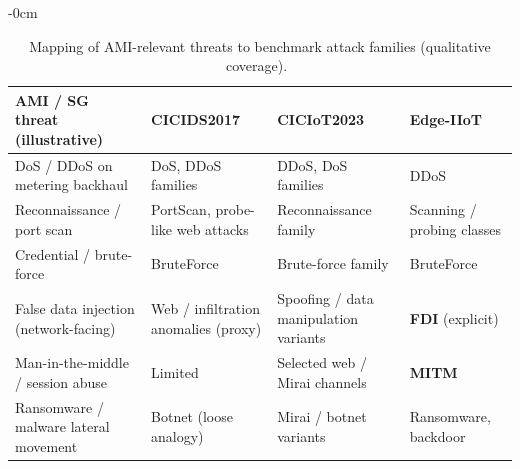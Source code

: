 \documentclass[sensors,article,submit,pdftex,moreauthors]{Definitions/mdpi}
\begin{document}
\begin{table}[H]
\caption{Mapping of AMI-relevant threats to benchmark attack families (qualitative coverage).~\label{tab:ami_threat_map}}
	\begin{adjustwidth}{-\extralength}{0cm}
		\begin{tabularx}{\fulllength}{>{\raggedright\arraybackslash}p{2.35cm} >{\raggedright\arraybackslash}X >{\raggedright\arraybackslash}X >{\raggedright\arraybackslash}X}
\toprule
\textbf{AMI / SG threat (illustrative)} & \textbf{CICIDS2017} & \textbf{CICIoT2023} & \textbf{Edge-IIoT} \\
\midrule
DoS / DDoS on metering backhaul & DoS, DDoS families & DDoS, DoS families & DDoS \\
Reconnaissance / port scan & PortScan, probe-like web attacks & Reconnaissance family & Scanning / probing classes \\
Credential / brute-force & BruteForce & Brute-force family & BruteForce \\
False data injection (network-facing) & Web / infiltration anomalies (proxy) & Spoofing / data manipulation variants & \textbf{FDI} (explicit) \\
Man-in-the-middle / session abuse & Limited & Selected web / Mirai channels & \textbf{MITM} \\
Ransomware / malware lateral movement & Botnet (loose analogy) & Mirai / botnet variants & Ransomware, backdoor \\
\bottomrule
\end{tabularx}
	\end{adjustwidth}
\end{table}
\end{document}
